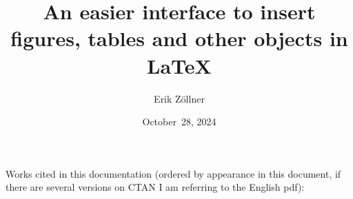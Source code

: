 \documentclass[a4paper]{article}
\title{An easier interface to insert figures, tables and other objects in \LaTeX}
\author{Erik Zöllner}
\date{October~28, 2024}
\newcommand{\myinput}[1]{\unskip}
\begin{document}
	\myinput{undescribed-keywords}
	\myinput{content/f1_titlepage}

	\myinput{content/s1_examples}
	\myinput{content/s2_names}
	\myinput{content/s3_documentation}

	\myinput{content/s4_installation}\notocspace
	\myinput{content/s5_bug-reports-and-contributions}\notocspace
	\myinput{content/s6_changelog}\notocspace
	\myinput{content/s7_license}

	\appendix
	\myinput{content/x1_motivation}\notocspace
	\myinput{content/x2_used-packages}\notocspace
	\myinput{content/x3_other-packages}\notocspace

	\section{\refname}
	\label{references}
	Works cited in this documentation (ordered by appearance in this document,
	if there are several versions on CTAN I am referring to the English pdf):
	\printbibliography[heading=none]

\end{document}
